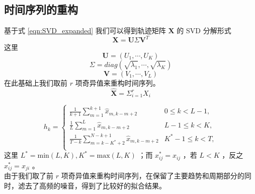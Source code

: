 \documentclass[a4paper]{article}
\begin{document}
\subsection{时间序列的重构}
基于式 \ref{eqn:SVD_expanded} 我们可以得到轨迹矩阵 $\textbf{X}$ 的 SVD 分解形式
\begin{equation}
	\label{eqn:SVD}
	\textbf{X} = \textbf{U} \Sigma \textbf{V}^T
\end{equation}
这里
\begin{equation}
	\label{eqn:SVD_U}
	\textbf{U} = (U_1, \cdots, U_K)
\end{equation}
\begin{equation}
	\label{eqn:SVD_Sigma}
	\Sigma = diag(\sqrt{\lambda_1}, \cdots, \sqrt{\lambda_K})
\end{equation}
\begin{equation}
	\label{eqn:SVD_V} 
	\textbf{V} = (V_1, \cdots, V_L)
\end{equation}
在此基础上我们取前 $r$ 项奇异值来重构时间序列。
\begin{equation}
	\label{eqn:ssa-x-hat}
	\hat{\textbf{X}} = \Sigma_{i=1}^r \textbf{$X_i$}
\end{equation}

\begin{equation}
	\label{eqn:ssa-fitting}
	h_k = 
	\begin{cases}
	\frac{1}{k+1} \sum_{m=1}^{k+1} \hat{x}_{m, k-m+2} & 0 \leq k < L - 1, \\
	\frac{1}{L} \sum_{m=1}^L \hat{x}_{m, k-m+2} & L - 1 \leq k < K, \\
	\frac{1}{T-k} \sum_{m=k-K^*+2}^{N-k+1} \hat{x}_{m, k-m+2} & K^* - 1 \leq k < T, \\
	\end{cases}
\end{equation}
这里 $L^* = \textrm{min}(L, K), K^* = \textrm{max}(L, K)$ ；而 $x_{ij}^* = x_{ij}$ ，若 $L<K$ ，反之 $x_{ij}^* = x_{ji}$ 。
\\
由于我们取了前 $r$ 项奇异值来重构时间序列，在保留了主要趋势和周期部分的同时，滤去了高频的噪音，得到了比较好的拟合结果。
\end{document}
